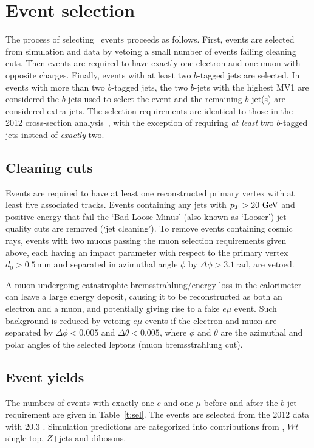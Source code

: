 \section{Event selection}
The process of selecting \emubb\ events proceeds as follows. First, events are selected from simulation and data by vetoing a small number of events failing cleaning cuts. Then events are required to have exactly one electron and one muon with opposite charges. Finally, events with at least two $b$-tagged jets are selected. In events with more than two $b$-tagged jets, the two $b$-jets with the highest MV1 are considered the $b$-jets used to select the event and the remaining $b$-jet(s) are considered extra jets. The selection requirements are identical to those in the 2012 \ttbar cross-section analysis~\cite{xsec}, with the exception of requiring \textit{at least} two $b$-tagged jets instead of \textit{exactly} two.

\subsection{Cleaning cuts}

Events are required to have at least one reconstructed primary vertex with at least five associated tracks. Events containing any jets with $p_T>20\GeV$ and positive energy that fail the `Bad Loose Minus' (also known as  `Looser') jet quality cuts \cite{jetcleaning} are removed (`jet cleaning'). To remove events containing cosmic rays, events with two muons passing the muon selection requirements given above, each having an impact parameter with respect to the primary vertex $d_0>0.5$\,mm and separated in azimuthal angle $\phi$ by $\Delta\phi>3.1$\,rad, are vetoed.

A muon undergoing catastrophic bremsstrahlung/energy loss in the calorimeter
can leave a large energy deposit, causing it to be reconstructed as both
an electron and a muon, and potentially giving rise to a fake $e\mu$ event.  Such background is reduced by vetoing $e\mu$ events if the electron and muon are separated by $\Delta\phi<0.005$ and $\Delta\theta<0.005$, where $\phi$ and $\theta$ are the azimuthal and polar angles of the selected leptons
(muon bremsstrahlung cut).

\subsection{Event yields}

The numbers of events with exactly one $e$ and one $\mu$ before and after the $b$-jet requirement are given in Table~\ref{t:sel}. The events are selected from the 2012  \TeV data with 20.3 \ifb. Simulation predictions are categorized into contributions from \ttbar, $Wt$ single top, $Z$+jets and dibosons. 

